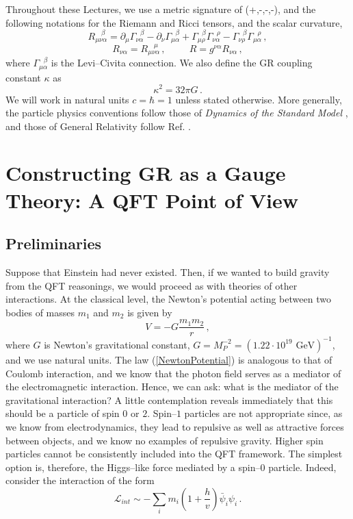\documentclass[12pt]{article}
\newcommand{\be}{\begin{equation}}
\newcommand{\ee}{\end{equation}}
\begin{document}
Throughout these Lectures, we use a metric signature of (+,-,-,-), and the following notations for the Riemann and Ricci tensors, and the scalar curvature,
\be
R_{\mu\nu\alpha}^{~~~~\beta}=\partial_\mu\Gamma_{\nu\alpha}^{~~~\beta}-\partial_\nu\Gamma_{\mu\alpha}^{~~~\beta}
+\Gamma_{\mu\rho}^{~~~\beta}\Gamma^{~~~\rho}_{\nu\alpha}-\Gamma_{\nu\rho}^{~~~\beta}\Gamma_{\mu\alpha}^{~~~\rho} \,,
\ee
\be
R_{\nu\alpha}=R_{\mu\nu\alpha}^{~~~~\mu}\,,~~~~~~~~~~~R=g^{\nu\alpha}R_{\nu\alpha}\,,
\ee
where $\Gamma_{\mu\alpha}^{~~~\beta}$ is the Levi--Civita connection. We also define the GR coupling constant $\kappa$ as
\be
\kappa^2 = 32\pi G\,.
\ee
We will work in natural units $c=\hbar=1$ unless stated otherwise. More generally, the particle physics conventions follow those of {\it Dynamics
of the Standard Model} \cite{Donoghue:1992dd}, and those of General Relativity follow Ref. \cite{Gasperini}.

\section{Constructing GR as a Gauge Theory: A QFT Point of View}
\label{sec:intro}

\subsection{Preliminaries}

Suppose that Einstein had never existed.
Then, if we wanted to build gravity from the QFT reasonings,
we would proceed as with theories of other interactions.
At the classical level, the Newton's potential acting between two bodies of masses $m_1$ and $m_2$ is given by
\begin{equation}\label{NewtonPotential}
V=-G\dfrac{m_1m_2}{r}\,,
\end{equation}
where $G$ is Newton's gravitational constant, $G=M_P^{-2}=(1.22\cdot 10^{19}\text{ GeV})^{-1}$, and we use natural units. The law (\ref{NewtonPotential}) is analogous to that of Coulomb interaction, and we know that the photon field serves as a mediator of the electromagnetic interaction. Hence, we can ask: what is the mediator of the gravitational interaction? A little contemplation reveals immediately that this should be a particle of spin $0$ or $2$. Spin--$1$ particles are not appropriate since, as we know from electrodynamics, they lead to repulsive as well as attractive forces between objects, and we know no examples of repulsive gravity. Higher spin particles cannot be consistently included into the QFT framework. The simplest option is, therefore, the Higgs--like force mediated by a spin--$0$ particle. Indeed, consider the interaction of the form
\begin{equation}
\mathcal{L}_{int}\sim -\sum_i m_i\left(1+\frac{h}{v}\right)\bar{\psi}_i\psi_i \,.
\end{equation}
\end{document}
